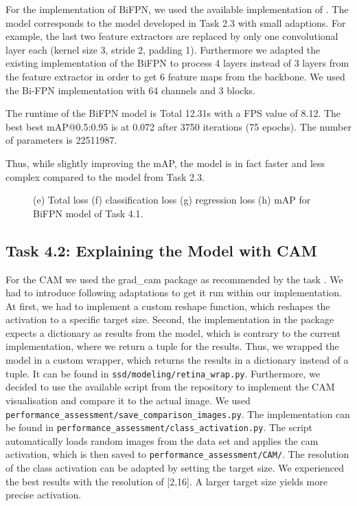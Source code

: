 \documentclass{article}
\begin{document}
For the implementation of BiFPN, we used the available implementation of \cite{efficientdet}. The model corresponds to the model developed in Task 2.3 with small adaptions. For example, the last two feature extractors are replaced by only one convolutional layer each (kernel size 3, stride 2, padding 1). Furthermore we adapted the existing implementation of the BiFPN to process 4 layers instead of 3 layers from the feature extractor in order to get 6 feature maps from the backbone. We used the Bi-FPN implementation with 64 channels and 3 blocks.

The runtime of the BiFPN model is Total 12.31s with a FPS value of 8.12. The best best mAP@0.5:0.95 is at 0.072 after 3750 iterations (75 epochs). The number of parameters is 22511987.

Thus, while slightly improving the mAP, the model is in fact faster and less complex compared to the model from Task 2.3.

\begin{figure}[t!]
    \centering
    \subfigure[]{}
    \vspace{-0.15cm}
    \subfigure[]{}
    \subfigure[]{}
    \subfigure[]{}
    \caption{(e) Total loss (f) classification loss (g) regression loss (h) mAP for BiFPN model of Task 4.1.}
    \label{fig:BiFPN}
\end{figure}




\subsection*{Task 4.2: Explaining the Model with CAM}

For the CAM we used the grad\_cam package as recommended by the task \cite{gradcam}. We had to introduce following adaptations to get it run within our implementation. At first, we had to implement a custom reshape function, which reshapes the activation to a specific target size. Second, the implementation in the package expects a dictionary as results from the model, which is contrary to the current implementation, where we return a tuple for the results. Thus, we wrapped the model in a custom wrapper, which returns the results in a dictionary instead of a tuple. It can be found in \texttt{ssd/modeling/retina\_wrap.py}. Furthermore, we decided to use the available script from the repository to implement the CAM visualisation and compare it to the actual image. We used \texttt{performance\_assessment/save\_comparison\_images.py}. The implementation can be found in \texttt{performance\_assessment/class\_activation.py}. The script automatically loads random images from the data set and applies the cam activation, which is then saved to \texttt{performance\_assessment/CAM/}. The resolution of the class activation can be adapted by setting the target size. We experienced the best results with the resolution of [2,16]. A larger target size yields more precise activation.
\end{document}
